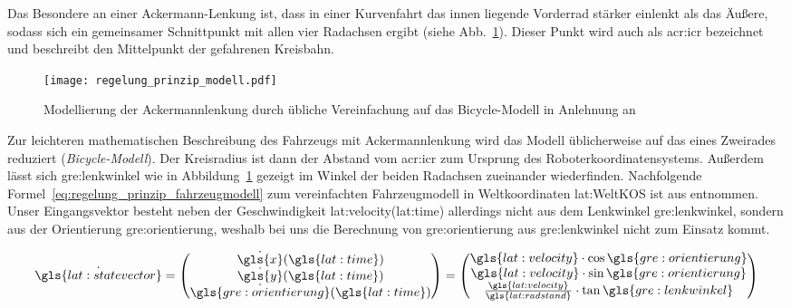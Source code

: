 Das Besondere an einer Ackermann-Lenkung ist, dass in einer Kurvenfahrt das innen liegende Vorderrad stärker einlenkt als das Äußere, sodass sich ein gemeinsamer Schnittpunkt mit allen vier Radachsen ergibt (siehe Abb.~\ref{fig:regelung_prinzip_modell}). Dieser Punkt wird auch als \gls{acr:icr} bezeichnet und beschreibt den Mittelpunkt der gefahrenen Kreisbahn. 

\begin{figure}[htbp] %
  \centering
  \texttt{[image: regelung\_prinzip\_modell.pdf]}
  \caption{Modellierung der Ackermannlenkung durch übliche Vereinfachung auf das Bicycle-Modell in Anlehnung an \autocite{corkeRoboticsVisionControl2017}}
  \label{fig:regelung_prinzip_modell}
\end{figure}

Zur leichteren mathematischen Beschreibung des Fahrzeugs mit Ackermannlenkung wird das Modell üblicherweise auf das eines Zweirades reduziert (\emph{Bicycle-Modell}). Der Kreisradius ist dann der Abstand vom \gls{acr:icr} zum Ursprung des Roboterkoordinatensystems. Außerdem lässt sich \gls{gre:lenkwinkel} wie in Abbildung~\ref{fig:regelung_prinzip_modell} gezeigt im Winkel der beiden Radachsen zueinander wiederfinden. Nachfolgende Formel~\eqref{eq:regelung_prinzip_fahrzeugmodell} zum vereinfachten Fahrzeugmodell in Weltkoordinaten \gls{lat:WeltKOS} ist aus \autocite{corkeRoboticsVisionControl2017} entnommen. Unser Eingangsvektor besteht neben der Geschwindigkeit \gls{lat:velocity}(\gls{lat:time}) allerdings nicht aus dem Lenkwinkel \gls{gre:lenkwinkel}, sondern aus der Orientierung \gls{gre:orientierung}, weshalb bei uns die Berechnung von \gls{gre:orientierung} aus \gls{gre:lenkwinkel} nicht zum Einsatz kommt. 

\begin{equation}
\dot{\gls{lat:statevector}} = 
\begin{pmatrix}
\dot{\gls{x}}(\gls{lat:time}) 	\\
\dot{\gls{y}}(\gls{lat:time})	\\
\dot{\gls{gre:orientierung}}(\gls{lat:time})    	\\
\end{pmatrix}
=
\begin{pmatrix}
\gls{lat:velocity} \cdot \cos \gls{gre:orientierung} 	\\
\gls{lat:velocity} \cdot \sin \gls{gre:orientierung} 	\\
\frac{\gls{lat:velocity}}{\gls{lat:radstand}} \cdot \tan \gls{gre:lenkwinkel}    	\\
\end{pmatrix}
\label{eq:regelung_prinzip_fahrzeugmodell}
\end{equation} 

